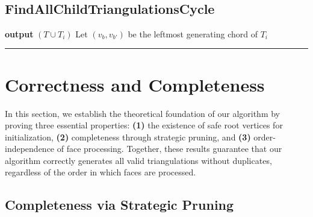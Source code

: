 ﻿﻿\documentclass[12pt,a4paper]{article}
\theoremstyle{definition}
\theoremstyle{remark}
\begin{document}
\subsection*{FindAllChildTriangulationsCycle}
\begin{algorithm}[H]
	\caption{FindAllChildTriangulationsCycle}
	\begin{algorithmic}[1]
		 
		\State \textbf{output} $(T \cup T_i)$
		\Else
		\State {}
		\EndIf
		\State Let $(v_b, v_{b'})$ be the leftmost generating chord of $T_i$
		\State {}
		\EndIf
		\EndFor
		\EndProcedure
	\end{algorithmic}
\end{algorithm}





\noindent\rule{\textwidth}{0.4pt}


\section{Correctness and Completeness}
\label{sec:correctness}

In this section, we establish the theoretical foundation of our algorithm by proving three essential properties: \textbf{(1)} the existence of safe root vertices for initialization, \textbf{(2)} completeness through strategic pruning, and \textbf{(3)} order-independence of face processing. Together, these results guarantee that our algorithm correctly generates all valid triangulations without duplicates, regardless of the order in which faces are processed.

\subsection{Completeness via Strategic Pruning}
\label{proof:pruning}
\end{document}
